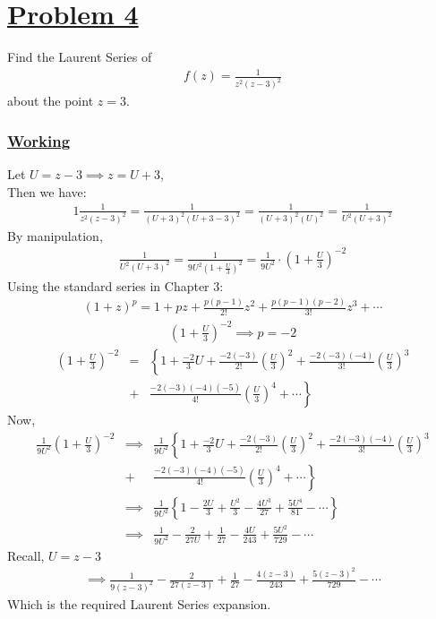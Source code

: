 \documentclass[12pt]{report}
\newcommand{\ubt}[1]{\textbf{\underline{#1}}}
\newcommand{\sps}{\\[0.2cm]}
\newcommand{\problem}[1]{\section*{\ubt{Problem #1}}}
\newcommand{\working}{\subsubsection{\ubt{Working}}}
\begin{document}
	\problem{4}
	Find the Laurent Series of 
	\begin{eqnarray*}
		f(z) = \frac{1}{z^2(z-3)^2}
	\end{eqnarray*}
	about the point $z=3$.
	\working
	Let $U=z-3\implies z=U+3$,
	\\Then we have:
	\begin{eqnarray*}
		1\frac{1}{z^2(z-3)^2} = \frac{1}{(U+3)^2(U+3-3)^2} = \frac{1}{(U+3)^2 (U)^2} = \frac{1}{U^2(U+3)^2}
	\end{eqnarray*}
	By manipulation,
	\begin{eqnarray*}
		\frac{1}{U^2(U+3)^2} = \frac{1}{9U^2\left(1+\frac{U}{3}\right)^2} = \frac{1}{9U^2}\cdot \left(1+\frac{U}{3}\right)^{-2}
	\end{eqnarray*}
	Using the standard series in Chapter 3:
	\begin{eqnarray*}
		(1+z)^p = 1+ pz + \frac{p(p-1)}{2!}z^2 + \frac{p(p-1)(p-2)}{3!}z^3 + \cdots
	\end{eqnarray*}
	\begin{eqnarray*}
		\left(1+\frac{U}{3}\right)^{-2} \implies p = - 2
	\end{eqnarray*}
	\begin{eqnarray*}
		\left(1+\frac{U}{3}\right)^{-2} &=& \left\{ 1 + \frac{-2}{3}U + \frac{-2(-3)}{2!}\left(\frac{U}{3}\right)^2 + \frac{-2(-3)(-4)}{3!}\left(\frac{U}{3}\right)^3\right. \sps
		 &+&\left. \frac{-2(-3)(-4)(-5)}{4!}\left(\frac{U}{3}\right)^4 + \cdots \right\}
	\end{eqnarray*}
	Now,
	\begin{eqnarray*}
		\frac{1}{9U^2}\left(1+\frac{U}{3}\right)^{-2} &\implies& \frac{1}{9U^2}\left\{ 1 + \frac{-2}{3}U + \frac{-2(-3)}{2!}\left(\frac{U}{3}\right)^2 + \frac{-2(-3)(-4)}{3!}\left(\frac{U}{3}\right)^3\right. \sps
		&+&\left. \frac{-2(-3)(-4)(-5)}{4!}\left(\frac{U}{3}\right)^4 + \cdots \right\}\sps
		&\implies& \frac{1}{9U^2}\left\{1-\frac{2U}{3}+\frac{U^2}{3} - \frac{4U^3}{27} + \frac{5U^4}{81} - \cdots\right\}\sps
		&\implies& \frac{1}{9U^2} - \frac{2}{27U} + \frac{1}{27} - \frac{4U}{243} + \frac{5U^2}{729} - \cdots
	\end{eqnarray*}
	Recall, $U = z-3$
	\begin{eqnarray*}
		\implies \frac{1}{9(z-3)^2} - \frac{2}{27(z-3)} + \frac{1}{27} - \frac{4(z-3)}{243} + \frac{5(z-3)^2}{729} - \cdots
	\end{eqnarray*}
	Which is the required Laurent Series expansion.
\end{document}
